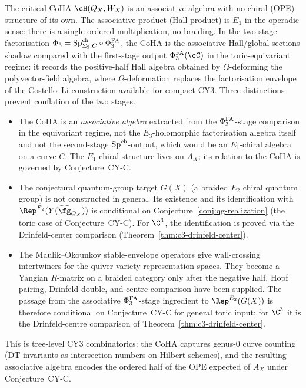 The critical CoHA $\cH(Q_X, W_X)$ is an associative algebra with no chiral (OPE) structure of its own. The associative product (Hall product) is $E_1$ in the operadic sense: there is a single ordered multiplication, no braiding. In the two-stage factorisation $\Phi_3 = \mathrm{Sp}^{\mathrm{ch}}_{\Sigma_2,C} \circ \Phi^{\mathrm{FA}}_3$, the CoHA is the associative Hall/global-sections shadow compared with the first-stage output $\PhiFA_3(\cC)$ in the toric-equivariant regime: it records the positive-half Hall algebra obtained by $\Omega$-deforming the polyvector-field algebra, where $\Omega$-deformation replaces the factorisation envelope of the Costello--Li construction available for compact CY3. Three distinctions prevent conflation of the two stages.
\begin{itemize}
 \item The CoHA is an \emph{associative algebra} extracted from the $\Phi^{\mathrm{FA}}_3$-stage comparison in the equivariant regime, not the $E_3$-holomorphic factorisation algebra itself and not the second-stage $\mathrm{Sp}^{\mathrm{ch}}$-output, which would be an $E_1$-chiral algebra on a curve $C$. The $E_1$-chiral structure lives on $A_X$; its relation to the CoHA is governed by Conjecture~CY-C.
 \item The conjectural quantum-group target $G(X)$ (a braided $E_2$ chiral quantum group) is not constructed in general. Its existence and its identification with $\Rep^{E_2}(Y(\widehat{\fg}_{Q_X}))$ is conditional on Conjecture~\ref{conj:qg-realization} (the toric case of Conjecture~CY-C). For $\C^3$, the identification is proved via the Drinfeld-center comparison (Theorem~\ref{thm:c3-drinfeld-center}).
 \item The Maulik--Okounkov stable-envelope operators give wall-crossing intertwiners for the quiver-variety representation spaces. They become a Yangian \(R\)-matrix on a braided category only after the negative half, Hopf pairing, Drinfeld double, and centre comparison have been supplied. The passage from the associative \(\Phi^{\mathrm{FA}}_3\)-stage ingredient to \(\Rep^{E_2}(G(X))\) is therefore conditional on Conjecture~CY-C for general toric input; for \(\C^3\) it is the Drinfeld-centre comparison of Theorem~\ref{thm:c3-drinfeld-center}.
\end{itemize}

This is tree-level CY3 combinatorics: the CoHA captures genus-$0$ curve counting (DT invariants as intersection numbers on Hilbert schemes), and the resulting associative algebra encodes the ordered half of the OPE expected of $A_X$ under Conjecture~CY-C.

